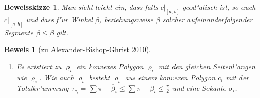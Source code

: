 \documentclass[paper=A4, twoside, chapterprefix=true, bibliography=totoc, headsepline]{scrbook}
\let\temp\phi
\let\phi\varphi
\let\varphi\temp
\let\temp\theta
\let\theta\vartheta
\let\vartheta\temp
\let\temp\epsilon
\let\epsilon\varepsilon
\let\varepsilon\temp
\let\temp\rho
\let\rho\varrho
\let\varrho\temp
\newcommand{\tikzgitter}[3][0.25]{ %
	\draw[step=#1,gray!15] #2 grid #3;
	\draw[step=2*#1,gray!30] #2 grid #3;
	\fill (0,0) circle(0.1); 
}
\theoremstyle{nonumberbreak}
\newtheorem{bew}{Beweis}
\newtheorem{bewSkiz}{Beweisskizze}
\theoremstyle{emptybreak}
\theoremstyle{break}
\begin{document}
\begin{bewSkiz}
Man sieht leicht ein, dass falls $c|_{[a,b]}$ geod"atisch ist, so auch $\overline c|_{[a,b]}$ und dass f"ur Winkel $\beta$, beziehungsweise $\overline\beta$ solcher aufeinanderfolgender Segmente $\beta \le \overline\beta$ gilt.
\end{bewSkiz}

\begin{bew}[zu Alexander-Bishop-Ghrist 2010]\begin{enumerate}[label=(\roman*),leftmargin=*,widest=ii]
\item
	Es existiert zu $\rho_i$ ein konvexes Polygon $\overline\rho_i$ mit den gleichen Seitenl"angen wie $\rho_i$.
	Wie auch $\rho_i$ besteht $\overline\rho_i$ aus einem konvexen Polygon $\overline c_i$ mit der Totalkr"ummung $\tau_{\overline c_i} = \sum \pi - \overline\beta_i \le \sum \pi - \beta_i \le \frac{\pi}{2}$ und eine Sekante $\sigma_i$.
	\begin{center}\begin{tikzpicture}[font=\scriptsize,scale=1.0]
		

\end{tikzpicture}
\end{center}
\end{enumerate}
\end{bew}
\end{document}
